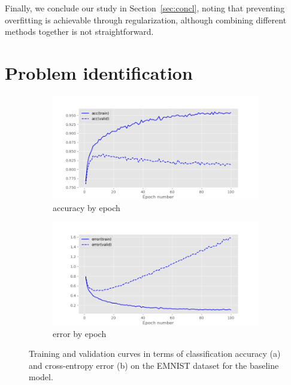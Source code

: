 \documentclass{article}
\begin{document}
Finally, we conclude our study in Section~\ref{sec:concl}, noting that preventing overfitting is achievable through regularization, although combining different methods together is not straightforward.


\section{Problem identification}
\label{sec:task1}

\begin{figure}[t]
    \centering
    \begin{subfigure}{\linewidth}
        \includegraphics[width=\linewidth]{figures/fig1_acc.png}
        \caption{accuracy by epoch}
        \label{fig:example_acccurves}
    \end{subfigure} 
    \begin{subfigure}{\linewidth}
        \centering
        \includegraphics[width=\linewidth]{figures/fig1_err.png}
        \caption{error by epoch}
        \label{fig:example_errorcurves}
    \end{subfigure} 
    \caption{Training and validation curves in terms of classification accuracy (a) and cross-entropy error (b) on the EMNIST dataset for the baseline model.}
    \label{fig:example}
\end{figure} 
\end{document}
